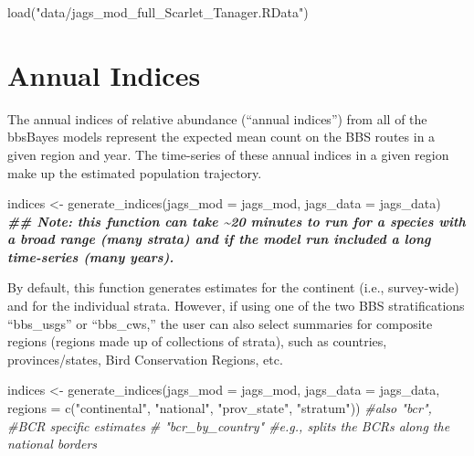 \documentclass[
]{book}
\newenvironment{Shaded}{\begin{snugshade}}{\end{snugshade}}
\newcommand{\AttributeTok}[1]{\textcolor[rgb]{0.77,0.63,0.00}{#1}}
\newcommand{\CommentTok}[1]{\textcolor[rgb]{0.56,0.35,0.01}{\textit{#1}}}
\newcommand{\DocumentationTok}[1]{\textcolor[rgb]{0.56,0.35,0.01}{\textbf{\textit{#1}}}}
\newcommand{\FunctionTok}[1]{\textcolor[rgb]{0.00,0.00,0.00}{#1}}
\newcommand{\NormalTok}[1]{#1}
\newcommand{\OtherTok}[1]{\textcolor[rgb]{0.56,0.35,0.01}{#1}}
\newcommand{\StringTok}[1]{\textcolor[rgb]{0.31,0.60,0.02}{#1}}
\begin{document}
\begin{Shaded}
\begin{Highlighting}[]
\FunctionTok{load}\NormalTok{(}\StringTok{"data/jags\_mod\_full\_Scarlet\_Tanager.RData"}\NormalTok{)}
\end{Highlighting}
\end{Shaded}

\hypertarget{annual-indices}{%
\section{Annual Indices}\label{annual-indices}}

The annual indices of relative abundance (``annual indices'') from all of the bbsBayes models represent the expected mean count on the BBS routes in a given region and year. The time-series of these annual indices in a given region make up the estimated population trajectory.

\begin{Shaded}
\begin{Highlighting}[]
\NormalTok{indices }\OtherTok{\textless{}{-}} \FunctionTok{generate\_indices}\NormalTok{(}\AttributeTok{jags\_mod =}\NormalTok{ jags\_mod,}
                            \AttributeTok{jags\_data =}\NormalTok{ jags\_data)}
\DocumentationTok{\#\# Note: this function can take \textasciitilde{}20 minutes to run for a species with a broad range (many strata) and if the model run included a long time{-}series (many years).}
\end{Highlighting}
\end{Shaded}

By default, this function generates estimates for the continent (i.e., survey-wide) and for the individual strata. However, if using one of the two BBS stratifications ``bbs\_usgs'' or ``bbs\_cws,'' the user can also select summaries for composite regions (regions made up of collections of strata), such as countries, provinces/states, Bird Conservation Regions, etc.

\begin{Shaded}
\begin{Highlighting}[]
\NormalTok{indices }\OtherTok{\textless{}{-}} \FunctionTok{generate\_indices}\NormalTok{(}\AttributeTok{jags\_mod =}\NormalTok{ jags\_mod,}
                            \AttributeTok{jags\_data =}\NormalTok{ jags\_data,}
                            \AttributeTok{regions =} \FunctionTok{c}\NormalTok{(}\StringTok{"continental"}\NormalTok{,}
                            \StringTok{"national"}\NormalTok{,}
                            \StringTok{"prov\_state"}\NormalTok{,}
                            \StringTok{"stratum"}\NormalTok{))}
                            \CommentTok{\#also "bcr", \#BCR specific estimates}
                            \CommentTok{\# "bcr\_by\_country" \#e.g., splits the BCRs along the national borders}
\end{Highlighting}
\end{Shaded}
\end{document}
